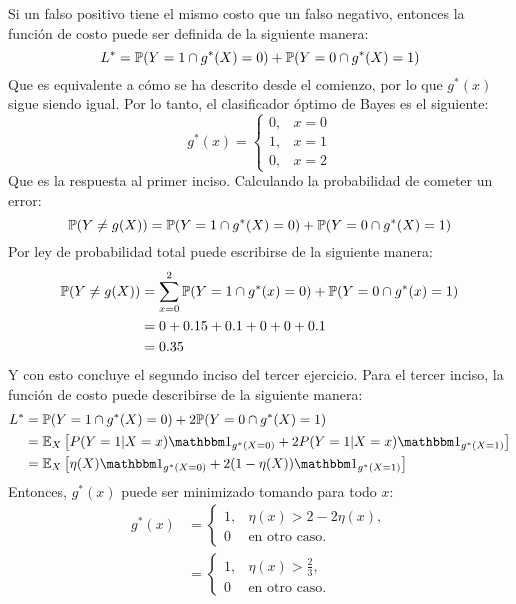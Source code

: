 Si un falso positivo tiene el mismo costo que un falso negativo, entonces la función de costo puede ser definida de la siguiente manera:
\begin{equation}
    L^* = \P(Y=1\cap g^*(X)=0) +  \P(Y=0\cap g^*(X)=1)
\end{equation}
Que es equivalente a cómo se ha descrito desde el comienzo, por lo que $g^*(x)$
sigue siendo igual. Por lo tanto, el clasificador óptimo de Bayes es el siguiente: 
\begin{equation}
    g^*(x) = 
    \begin{cases}
        0, & x=0 \\
        1, & x=1 \\
        0, & x=2
    \end{cases}\label{eq:Bayes}
\end{equation}
Que es la respuesta al primer inciso. Calculando la probabilidad de cometer un error: 
\begin{equation}
    \P(Y\ne g(X)) = \P(Y=1\cap g^*(X)=0) +  \P(Y=0\cap g^*(X)=1)
\end{equation}
Por ley de probabilidad total puede escribirse de la siguiente manera: 
\begin{align*}
    \P(Y\ne g(X)) &= \sum_{x=0}^2 \P(Y=1\cap g^*(x)=0) + \P(Y=0\cap g^*(x)=1) \\
     &= 0 + 0.15 + 0.1 + 0 + 0 + 0.1 \\
     &= 0.35
\end{align*} 
Y con esto concluye el segundo inciso del tercer ejercicio. Para el tercer inciso, 
la función de costo puede describirse de la siguiente manera: 
\begin{align}
    L^* &= \P(Y=1\cap g^*(X)=0) +  2\P(Y=0\cap g^*(X)=1) \\
        &= \E_X\left[P(Y=1|X=x)\ind[g^*(X=0)]+2P(Y=1|X=x)\ind[g^*(X=1)]\right] \\
        &= \E_X\left[\eta(X)\ind[g^*(X=0)]+2(1-\eta(X))\ind[g^*(X=1)]\right]
\end{align}
Entonces, $g^*(x)$ puede ser minimizado tomando para todo $x$:
\begin{align}
    g^*(x) &= 
    \begin{cases}
        1, & \eta(x) > 2-2\eta(x), \\
        0 & \text{en otro caso.} 
    \end{cases} \\
    &=
    \begin{cases}
        1, & \eta(x) > \frac{2}{3}, \\
        0 & \text{en otro caso.} 
    \end{cases}
\end{align}
